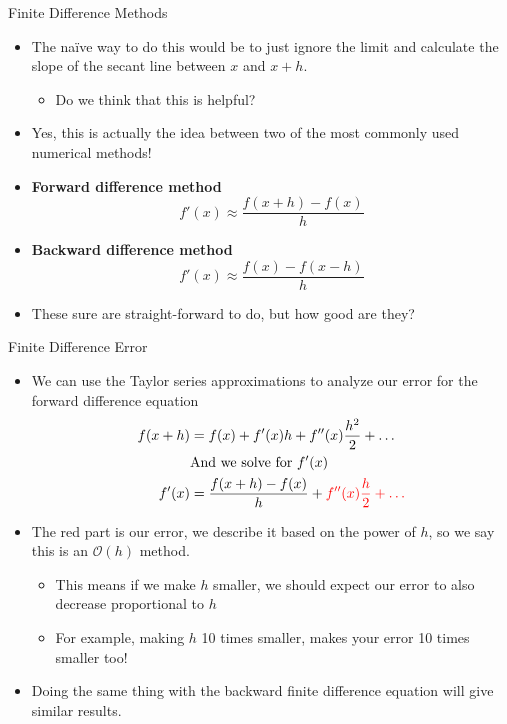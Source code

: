 {}\documentclass[letterpaper,
compress,
xcolor=x11names,
]{beamer}
\begin{document}

\begin{frame}{Finite Difference Methods}
	\footnotesize
	\begin{itemize}
		\item The na\"{i}ve way to do this would be to just ignore the limit and calculate the slope of the secant line between $x$ and $x+h$.
		\begin{itemize}
			\item Do we think that this is helpful?
		\end{itemize} 
		\item Yes, this is actually the idea between two of the most commonly used numerical methods!
		\item \textbf{Forward difference method}
			\begin{equation*}
				f'(x) \approx \frac{f(x+h) - f(x)}{h}
			\end{equation*}
		\item \textbf{Backward difference method}
		\begin{equation*}
			f'(x) \approx \frac{f(x) - f(x-h)}{h}
		\end{equation*}
		\item These sure are straight-forward to do, but how good are they?
	\end{itemize}
\end{frame}


\begin{frame}{Finite Difference Error}
	\footnotesize
	\begin{itemize}
		\item We can use the Taylor series approximations to analyze our error for the forward difference equation
		\begin{align*}
			f(x+h) &= f(x) + f'(x)h + f''(x)\frac{h^2}{2} + \dots \\
			&\text{And we solve for } f'(x) \\
			f'(x) &= \frac{f(x+h)-f(x)}{h} + \textcolor{red}{f''(x)\frac{h}{2} + \dots} \\
		\end{align*}
		\item The red part is our error, we describe it based on the power of $h$, so we say this is an $\mathcal{O}(h)$ method.
		\begin{itemize}
			\item This means if we make $h$ smaller, we should expect our error to also decrease proportional to $h$
			\item For example, making $h$ 10 times smaller, makes your error 10 times smaller too!
		\end{itemize}
		\item Doing the same thing with the backward finite difference equation will give similar results.		
	\end{itemize}
\end{frame}
\end{document}
